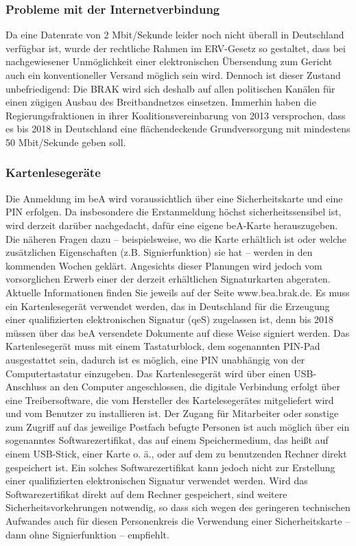 \subsubsection{Probleme mit der Internetverbindung}
Da eine Datenrate von 2 Mbit/Sekunde leider noch nicht überall in Deutschland verfügbar ist, wurde der rechtliche Rahmen im ERV-Gesetz so gestaltet, dass bei nachgewiesener Unmöglichkeit einer elektronischen Übersendung zum Gericht auch ein konventioneller Versand möglich sein wird. Dennoch ist dieser Zustand unbefriedigend: Die BRAK wird sich deshalb auf allen politischen Kanälen für einen zügigen Ausbau des Breitbandnetzes einsetzen. Immerhin haben die Regierungsfraktionen in ihrer Koalitionsvereinbarung von 2013 versprochen, dass es bis 2018 in Deutschland eine flächendeckende Grundversorgung mit mindestens 50 Mbit/Sekunde geben soll.

\subsubsection{Kartenlesegeräte}
Die Anmeldung im beA wird voraussichtlich über eine Sicherheitskarte und eine PIN erfolgen. Da insbesondere die Erstanmeldung höchst sicherheitssensibel ist, wird derzeit darüber nachgedacht, dafür eine eigene beA-Karte herauszugeben. Die näheren Fragen dazu – beispielsweise, wo die Karte erhältlich ist oder welche zusätzlichen Eigenschaften (z.B. Signierfunktion) sie hat – werden in den kommenden Wochen geklärt. Angesichts dieser Planungen wird jedoch vom vorsorglichen Erwerb einer der derzeit erhältlichen Signaturkarten abgeraten. Aktuelle Informationen finden Sie jeweils auf der Seite www.bea.brak.de. Es muss ein Kartenlesegerät verwendet werden, das in Deutschland für die Erzeugung einer qualifizierten elektronischen Signatur (qeS) zugelassen ist, denn bis 2018 müssen über das beA versendete Dokumente auf diese Weise signiert werden. Das Kartenlesegerät muss mit einem Tastaturblock, dem sogenannten PIN-Pad ausgestattet sein, dadurch ist es möglich, eine PIN unabhängig von der Computertastatur einzugeben. Das Kartenlesegerät wird über einen USB-Anschluss an den Computer angeschlossen, die digitale Verbindung erfolgt über eine Treibersoftware, die vom Hersteller des Kartelesegerätes mitgeliefert wird und vom Benutzer zu installieren ist. Der Zugang für Mitarbeiter oder sonstige zum Zugriff auf das jeweilige Postfach befugte Personen ist auch möglich über ein sogenanntes Softwarezertifikat, das auf einem Speichermedium, das heißt auf einem USB-Stick, einer Karte o. ä., oder auf dem zu benutzenden Rechner direkt gespeichert ist. Ein solches Softwarezertifikat kann jedoch nicht zur Erstellung einer qualifizierten elektronischen Signatur verwendet werden. Wird das Softwarezertifikat direkt auf dem Rechner gespeichert, sind weitere Sicherheitsvorkehrungen notwendig, so dass sich wegen des geringeren technischen Aufwandes auch für diesen Personenkreis die Verwendung einer Sicherheitskarte – dann ohne Signierfunktion – empfiehlt.

